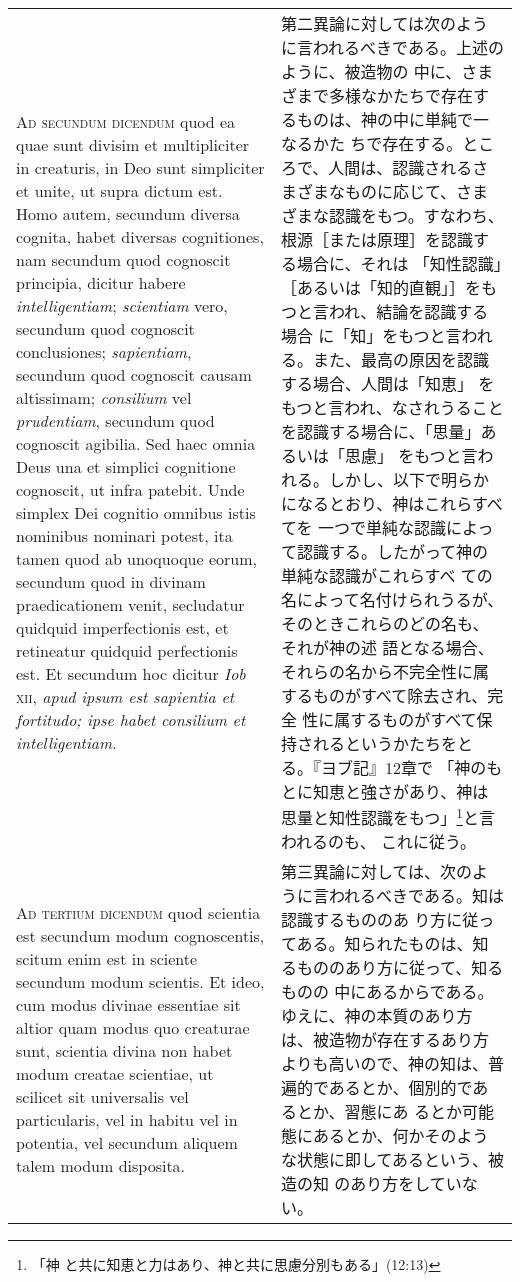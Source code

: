 \documentclass[10pt]{jsarticle} %
\begin{document}
\begin{longtable}{p{21em}p{21em}}
\\



{\scshape Ad secundum dicendum} quod ea quae sunt divisim et
multipliciter in creaturis, in Deo sunt simpliciter et unite, ut supra
dictum est. Homo autem, secundum diversa cognita, habet diversas
cognitiones, nam secundum quod cognoscit principia, dicitur habere
{\itshape intelligentiam}; {\itshape scientiam} vero, secundum quod
cognoscit conclusiones; {\itshape sapientiam}, secundum quod cognoscit
causam altissimam; {\itshape consilium} vel {\itshape prudentiam},
secundum quod cognoscit agibilia. Sed haec omnia Deus una et simplici
cognitione cognoscit, ut infra patebit. Unde simplex Dei cognitio
omnibus istis nominibus nominari potest, ita tamen quod ab unoquoque
eorum, secundum quod in divinam praedicationem venit, secludatur
quidquid imperfectionis est, et retineatur quidquid perfectionis est. Et
secundum hoc dicitur {\itshape Iob} {\scshape xii}, {\itshape apud ipsum
est sapientia et fortitudo; ipse habet consilium et intelligentiam}.

&

第二異論に対しては次のように言われるべきである。上述のように、被造物の
中に、さまざまで多様なかたちで存在するものは、神の中に単純で一なるかた
ちで存在する。ところで、人間は、認識されるさまざまなものに応じて、さま
ざまな認識をもつ。すなわち、根源［または原理］を認識する場合に、それは
「知性認識」［あるいは「知的直観」］をもつと言われ、結論を認識する場合
に「知」をもつと言われる。また、最高の原因を認識する場合、人間は「知恵」
をもつと言われ、なされうることを認識する場合に、「思量」あるいは「思慮」
をもつと言われる。しかし、以下で明らかになるとおり、神はこれらすべてを
一つで単純な認識によって認識する。したがって神の単純な認識がこれらすべ
ての名によって名付けられうるが、そのときこれらのどの名も、それが神の述
語となる場合、それらの名から不完全性に属するものがすべて除去され、完全
性に属するものがすべて保持されるというかたちをとる。『ヨブ記』12章で
「神のもとに知恵と強さがあり、神は思量と知性認識をもつ」\footnote{「神
と共に知恵と力はあり、神と共に思慮分別もある」(12:13)}と言われるのも、
これに従う。

\\



{\scshape Ad tertium dicendum} quod scientia est secundum modum
cognoscentis, scitum enim est in sciente secundum modum scientis. Et
ideo, cum modus divinae essentiae sit altior quam modus quo creaturae
sunt, scientia divina non habet modum creatae scientiae, ut scilicet
sit universalis vel particularis, vel in habitu vel in potentia, vel
secundum aliquem talem modum disposita.

&

第三異論に対しては、次のように言われるべきである。知は認識するもののあ
り方に従ってある。知られたものは、知るもののあり方に従って、知るものの
中にあるからである。ゆえに、神の本質のあり方は、被造物が存在するあり方
よりも高いので、神の知は、普遍的であるとか、個別的であるとか、習態にあ
るとか可能態にあるとか、何かそのような状態に即してあるという、被造の知
のあり方をしていない。



\end{longtable}
\end{document}
